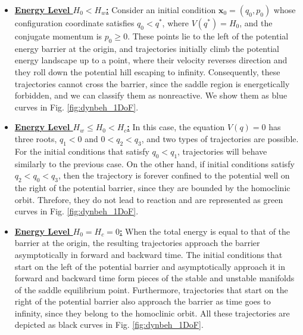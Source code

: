 \documentclass[8pt]{article}
\begin{document}
\begin{itemize}
	\item \underline{\textbf{Energy Level $H_0 < H_w$:}} Consider an initial condition $\mathbf{x}_0 = (q_0,p_0)$ whose configuration coordinate satisfies $q_0 < q^{\ast}$, where $V(q^{\ast}) = H_0$, and the conjugate momentum is $p_0 \geq 0$. These points lie to the left of the potential energy barrier at the origin, and trajectories initially climb the potential energy landscape up to a point, where their velocity reverses direction and they roll down the potential hill escaping to infinity. Consequently, these trajectories cannot cross the barrier, since the saddle region is energetically forbidden, and we can classify them as nonreactive. We show them as blue curves in Fig. \ref{fig:dynbeh_1DoF}.
	
	\item \underline{\textbf{Energy Level $H_w \leq H_0 < H_c$:}} In this case, the equation $V(q) = 0$ has three roots, $q_1 < 0$ and $0 < q_2 < q_3$, and two types of trajectories are possible. For the initial conditions that satisfy $q_0 < q_1$, trajectories will behave similarly to the previous case. On the other hand, if initial conditions satisfy $q_2 < q_0 < q_3$, then the trajectory is forever confined to the potential well on the right of the potential barrier, since they are bounded by the homoclinic orbit. Threfore, they do not lead to reaction and are represented as green curves in Fig. \ref{fig:dynbeh_1DoF}. 
	
	\item \underline{\textbf{Energy Level $H_0 = H_c = 0$:}} When the total energy is equal to that of the barrier at the origin, the resulting trajectories approach the barrier asymptotically in forward and backward time. The initial conditions that start on the left of the potential barrier and asymptotically approach it in forward and backward time form pieces of the stable and unstable manifolds of the saddle equilibrium point. Furthermore, trajectories that start on the right of the potential barrier also approach the barrier as time goes to infinity, since they belong to the homoclinic orbit. All these trajectories are depicted as  black curves in Fig. \ref{fig:dynbeh_1DoF}.  
	

\end{itemize}
\end{document}
